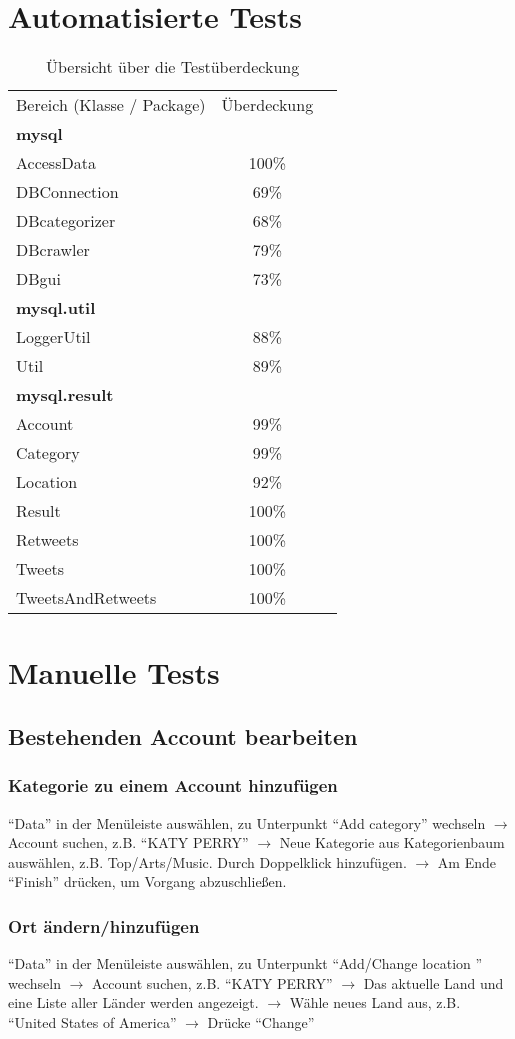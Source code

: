 \section{Automatisierte Tests}

\begin{table}[h]
\begin{tabular} {lcr}
Bereich (Klasse / Package) & Überdeckung \\
		\textbf{mysql} &  \\
		AccessData & 100\% \\
		DBConnection & 69\% \\
		DBcategorizer & 68\% \\
		DBcrawler & 79\% \\
		DBgui & 73\% \\
		\textbf{mysql.util} &  \\
		LoggerUtil & 88\% \\
		Util & 89\% \\
		\textbf{mysql.result} &  \\
		Account & 99\% \\
		Category & 99\% \\
		Location & 92\% \\
		Result & 100\% \\
		Retweets & 100\% \\
		Tweets & 100\% \\
		TweetsAndRetweets & 100\% \\
	\end{tabular}
	\caption{Übersicht über die Testüberdeckung}
\end{table}

\section{Manuelle Tests}

\subsection{Bestehenden Account bearbeiten}

\subsubsection{Kategorie zu einem Account hinzufügen}
"`Data"' in der Menüleiste auswählen, zu Unterpunkt "`Add category"' wechseln $\to$ Account suchen,  z.B. "`KATY PERRY"' $\to$ Neue Kategorie aus Kategorienbaum auswählen, z.B. Top/Arts/Music. Durch Doppelklick hinzufügen. $\to$ Am Ende "`Finish"' drücken, um Vorgang abzuschließen.

\subsubsection{Ort ändern/hinzufügen}
"`Data"' in der Menüleiste auswählen, zu Unterpunkt "`Add/Change location "' wechseln $\to$ Account suchen,  z.B. "`KATY PERRY"' $\to$ Das aktuelle Land und eine Liste aller Länder werden angezeigt. $\to$ Wähle neues Land aus, z.B. "`United States of America"' $\to$ Drücke "`Change"'
